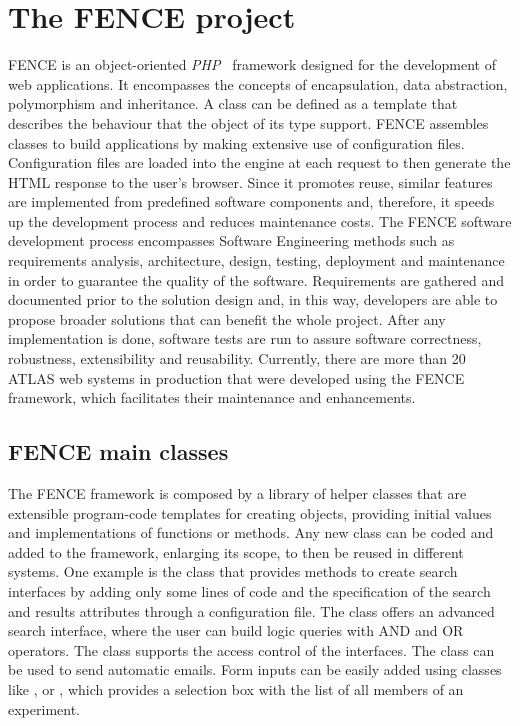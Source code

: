 
\section{The FENCE project}%
\label{sec:The_FENCE_project}

FENCE is an object-oriented \textit{PHP}~\cite{php} framework designed for the development of web applications. It encompasses the concepts of encapsulation, data abstraction, polymorphism and inheritance. A class can be defined as a template that describes the behaviour that the object of its type support. FENCE assembles classes to build applications by making extensive use of configuration files. Configuration files are loaded into the engine at each request to then generate the HTML response to the user’s browser.
Since it promotes reuse, similar features are implemented from predefined software components and, therefore, it speeds up the development process and reduces maintenance costs.
The FENCE software development process encompasses Software Engineering methods such as requirements analysis, architecture, design, testing, deployment and maintenance in order to guarantee the quality of the software. Requirements are gathered and documented prior to the solution design and, in this way, developers are able to propose broader solutions that can benefit the whole project. After any implementation is done, software tests are run to assure software correctness, robustness, extensibility and reusability. Currently, there are more than 20 ATLAS web systems in production that were developed using the FENCE framework, which facilitates their maintenance and enhancements.

\subsection{FENCE main classes}%
\label{sec:FENCE_main_classes}

The FENCE framework is composed by a library of helper classes that are extensible program-code templates for creating objects, providing initial values and implementations of functions or methods.
Any new class can be coded and added to the framework, enlarging its scope, to then be reused in different systems.
One example is the  class that provides methods to create search interfaces by adding only some lines of code and the specification of the search and results attributes through a configuration file.
The  class offers an advanced search interface, where the user can build logic queries with AND and OR operators.
The  class supports the access control of the interfaces.
The  class can be used to send automatic emails.
Form inputs can be easily added using classes like ,  or , which provides a selection box with the list of all members of an experiment.

